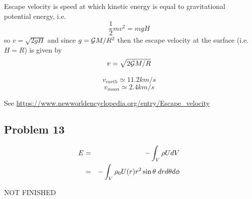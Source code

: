 Escape velocity is speed at which kinetic energy is equal to gravitational 
potential energy, i.e. 
\[
\frac{1}{2}m v^2 = m g H
\]
so $v=\sqrt{2gH}$ and since $g={\cal G}M/R^2$
then the escape velocity at the surface (i.e. $H=R$) is given by
\[
v = \sqrt{2 {\cal G} M/ R}
\]

\[
v_{earth} \simeq 11.2 km/s
\]
\[
v_{moon} \simeq 2.4 km/s
\]

See \url{https://www.newworldencyclopedia.org/entry/Escape_velocity}

\subsection{Problem 13}

\begin{eqnarray}
E 
&=& - \int_V \rho U dV \nonumber\\
&=& - \int_V \rho_0  U(r) r^2 \sin\theta \; dr d\theta d\phi \nonumber\\
\end{eqnarray}

NOT FINISHED





